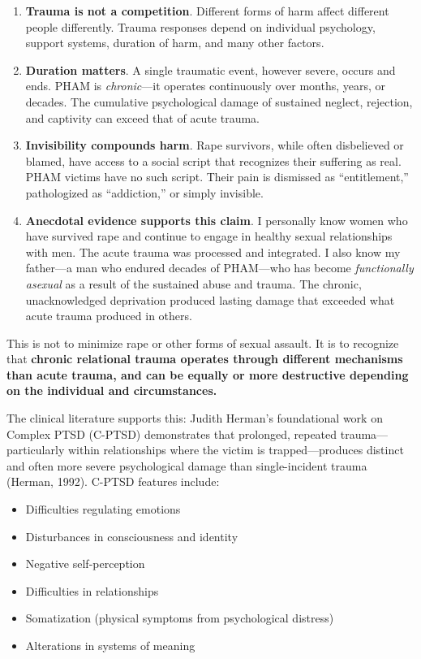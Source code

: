 \documentclass[12pt,openany]{book}
\numberwithin{equation}{chapter}
\begin{document}
\begin{enumerate}
    \item \textbf{Trauma is not a competition}. Different forms of harm affect different people differently. Trauma responses depend on individual psychology, support systems, duration of harm, and many other factors.
    
    \item \textbf{Duration matters}. A single traumatic event, however severe, occurs and ends. PHAM is \textit{chronic}---it operates continuously over months, years, or decades. The cumulative psychological damage of sustained neglect, rejection, and captivity can exceed that of acute trauma.
    
    \item \textbf{Invisibility compounds harm}. Rape survivors, while often disbelieved or blamed, have access to a social script that recognizes their suffering as real. PHAM victims have no such script. Their pain is dismissed as ``entitlement,'' pathologized as ``addiction,'' or simply invisible.
    
    \item \textbf{Anecdotal evidence supports this claim}. I personally know women who have survived rape and continue to engage in healthy sexual relationships with men. The acute trauma was processed and integrated. I also know my father---a man who endured decades of PHAM---who has become \textit{functionally asexual} as a result of the sustained abuse and trauma. The chronic, unacknowledged deprivation produced lasting damage that exceeded what acute trauma produced in others.
\end{enumerate}

This is not to minimize rape or other forms of sexual assault. It is to recognize that \textbf{chronic relational trauma operates through different mechanisms than acute trauma, and can be equally or more destructive depending on the individual and circumstances.}

The clinical literature supports this: Judith Herman's foundational work on Complex PTSD (C-PTSD) demonstrates that prolonged, repeated trauma---particularly within relationships where the victim is trapped---produces distinct and often more severe psychological damage than single-incident trauma (Herman, 1992). C-PTSD features include:

\begin{itemize}
    \item Difficulties regulating emotions
    \item Disturbances in consciousness and identity
    \item Negative self-perception
    \item Difficulties in relationships
    \item Somatization (physical symptoms from psychological distress)
    \item Alterations in systems of meaning
\end{itemize}
\end{document}
